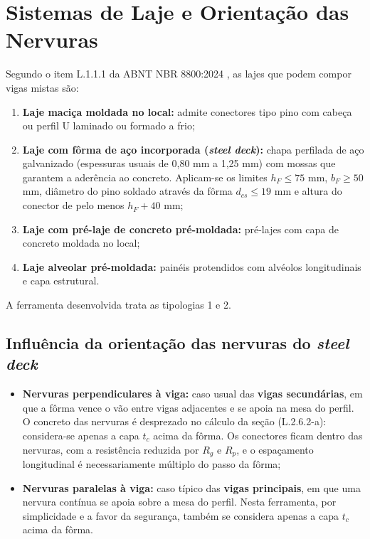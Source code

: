 \section{Sistemas de Laje e Orientação das Nervuras}\label{sec:2.2}
Segundo o item L.1.1.1 da ABNT NBR 8800:2024 \cite{abnt8800:2024}, as lajes que podem compor vigas mistas são:
\begin{enumerate}
\item \textbf{Laje maciça moldada no local:} admite conectores tipo pino com cabeça ou perfil U laminado ou formado a frio;
\item \textbf{Laje com fôrma de aço incorporada (\emph{steel deck}):} chapa perfilada de aço galvanizado (espessuras usuais de 0,80 mm a 1,25 mm) com mossas que garantem a aderência ao concreto. Aplicam-se os limites $h_F \le 75$ mm, $b_F \ge 50$ mm, diâmetro do pino soldado através da fôrma $d_{cs} \le 19$ mm e altura do conector de pelo menos $h_F + 40$ mm;
\item \textbf{Laje com pré-laje de concreto pré-moldada:} pré-lajes com capa de concreto moldada no local;
\item \textbf{Laje alveolar pré-moldada:} painéis protendidos com alvéolos longitudinais e capa estrutural.
\end{enumerate}

A ferramenta desenvolvida trata as tipologias 1 e 2.

\subsection{Influência da orientação das nervuras do \emph{steel deck}}
\begin{itemize}
\item \textbf{Nervuras perpendiculares à viga:} caso usual das \textbf{vigas secundárias}, em que a fôrma vence o vão entre vigas adjacentes e se apoia na mesa do perfil. O concreto das nervuras é desprezado no cálculo da seção (L.2.6.2-a): considera-se apenas a capa $t_c$ acima da fôrma. Os conectores ficam dentro das nervuras, com a resistência reduzida por $R_g$ e $R_p$, e o espaçamento longitudinal é necessariamente múltiplo do passo da fôrma;
\item \textbf{Nervuras paralelas à viga:} caso típico das \textbf{vigas principais}, em que uma nervura contínua se apoia sobre a mesa do perfil. Nesta ferramenta, por simplicidade e a favor da segurança, também se considera apenas a capa $t_c$ acima da fôrma.
\end{itemize}

